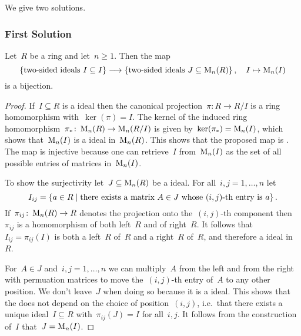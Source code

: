 \section{}





\subsection{}
\label{ideals in matrix rings}


We give two solutions.



\subsubsection{First Solution}


\begin{lemma}
  Let~$R$ be a ring and let~$n \geq 1$.
  Then the map
  \[
            \{ \text{{\twosided} ideals~$I \subseteq I$} \}
    \longto \{ \text{{\twosided} ideals~$J \subseteq \mat{n}{R}$} \} \,,
    \quad   I
    \mapsto \mat{n}{I}
  \]
  is a {\welldef} bijection.
\end{lemma}


\begin{proof}
  If~$I \subseteq R$ is a {\twosided} ideal then the canonical projection~$\pi \colon R \to R/I$ is a ring homomorphism with~$\ker(\pi) = I$.
  The kernel of the induced ring homomorphism~$\pi_* \colon \operatorname{M}_{n}(R) \to \operatorname{M}_{n}(R/I)$ is given by~$\ker(\pi_*) = \operatorname{M}_{n}(I)$, which shows that~$\operatorname{M}_{n}(I)$ is a {\twosided} ideal in~$\operatorname{M}_{n}(R)$.
  This shows that the proposed map is {\welldef}.
  The map is injective because one can retrieve~$I$ from~$\operatorname{M}_{n}(I)$ as the set of all possible entries of matrices in~$\operatorname{M}_{n}(I)$.
  
  To show the surjectivity let~$J \subseteq \operatorname{M}_{n}(R)$ be a {\twosided} ideal.
  For all~$i,j = 1, \dotsc, n$ let
  \[
      I_{ij}
    = \{
        a \in R
      \suchthat
        \text{there exists a matrix~$A \in J$ whose~$(i,j)$-th entry is~$a$}
      \} \,.
  \]
  If~$\pi_{ij} \colon \operatorname{M}_{n}(R) \to R$ denotes the projection onto the~$(i,j)$-th component then~$\pi_{ij}$ is a homomorphism of both left~$R${\dashmods} and of right~$R${\dashmods}.
  It follows that~$I_{ij} = \pi_{ij}(I)$ is both a left~$R${\dashsmod} of~$R$ and a right~$R${\dashsmod} of~$R$, and therefore a {\twosided} ideal in~$R$.
  
  For~$A \in J$ and~$i, j = 1, \dotsc, n$ we can multiply~$A$ from the left and from the right with permuation matrices to move the~$(i,j)$-th entry of~$A$ to any other position.
  We don’t leave~$J$ when doing so because it is a {\twosided} ideal.
  This shows that the {\twosided} does not depend on the choice of position~$(i,j)$, i.e.\ that there exists a unique {\twosided} ideal~$I \subseteq R$ with~$\pi_{ij}(J) = I$ for all~$i,j$.
  It follows from the construction of~$I$ that~$J = \operatorname{M}_{n}(I)$.
\end{proof}


